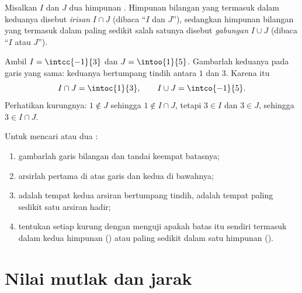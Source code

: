 \begin{definition}\label{def:g10:numbers:interunion}
Misalkan $I$ dan $J$ dua himpunan . Himpunan bilangan yang
termasuk dalam keduanya disebut \emph{irisan} $I \cap J$
(dibaca ``$I$ dan $J$''), sedangkan himpunan bilangan yang termasuk dalam
paling sedikit salah satunya disebut \emph{gabungan}
$I \cup J$ (dibaca ``$I$ atau $J$'').
\end{definition}

\begin{example}\label{ex:g10:numbers:interunion}
Ambil $I = \intcc{-1}{3}$ dan $J = \intoo{1}{5}$. Gambarlah keduanya pada
garis yang sama: keduanya bertumpang tindih antara $1$ dan $3$. Karena itu
\[
I \cap J = \intoc{1}{3},
\qquad
I \cup J = \intco{-1}{5}.
\]
Perhatikan kurungnya: $1 \notin J$ sehingga $1 \notin I \cap J$, tetapi
$3 \in I$ dan $3 \in J$, sehingga $3 \in I \cap J$.
\end{example}

\begin{method}\label{met:g10:numbers:intervals}
Untuk mencari  atau  dua :
\begin{enumerate}
  \item gambarlah garis bilangan dan tandai keempat batasnya;
  \item arsirlah  pertama di atas garis dan  kedua di bawahnya;
  \item {} adalah tempat kedua arsiran bertumpang tindih, 
        adalah tempat paling sedikit satu arsiran hadir;
  \item tentukan setiap kurung dengan menguji apakah batas itu sendiri
        termasuk dalam kedua himpunan () atau paling sedikit dalam satu
        himpunan ().
\end{enumerate}
\end{method}

\section{Nilai mutlak dan jarak}

